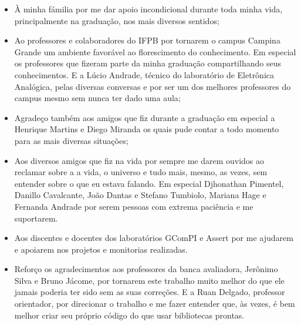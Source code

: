\begin{agradecimentos}
  \begin{itemize}
    \item À minha fámilia por me dar apoio incondicional durante toda minha vida, principalmente na graduação, nos mais diversos sentidos;
    \item Ao professores e colaboradores do IFPB por tornarem o campus Campina Grande um ambiente favorável ao florescimento do conhecimento. Em especial os professores que fizeram parte da minha graduação compartilhando seus conhecimentos. E a Lúcio Andrade, técnico do laboratório de Eletrônica Analógica, pelas diversas conversas e por ser um dos melhores professores do campus mesmo sem nunca ter dado uma aula;
    \item Agradeço também aos amigos que fiz durante a graduação em especial a Henrique Martins e Diego Miranda os quais pude contar a todo momento para as mais diversas situações;
    \item Aos diversos amigos que fiz na vida por sempre me darem ouvidos ao reclamar sobre a a vida, o universo e tudo mais, mesmo, as vezes, sem entender sobre o que eu estava falando. Em especial Djhonathan Pimentel, Danillo Cavalcante, João Dantas e Stefano Tumbiolo, Mariana Hage e Fernanda Andrade por serem pessoas com extrema paciência e me suportarem.
    \item Aos discentes e docentes dos laboratórios GComPI e Assert por me ajudarem e apoiarem nos projetos e monitorias realizadas.
    \item Reforço os agradecimentos aos professores da banca avaliadora, Jerônimo Silva e Bruno Jácome, por tornarem este trabalho muito melhor do que ele jamais poderia ter sido sem as suas correções. E a Ruan Delgado, professor orientador, por direcionar o trabalho e me fazer entender que, às vezes, é bem melhor criar seu próprio código do que usar bibliotecas prontas.
  \end{itemize}
\end{agradecimentos}
